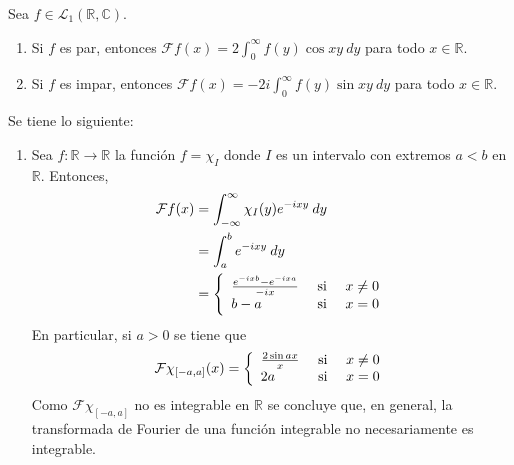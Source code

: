 \documentclass[12pt]{report}
\theoremstyle{largebreak}
\newcommand\cf[3]{\ensuremath{#1:#2\rightarrow#3}}
\newcommand{\fou}[1]{\ensuremath{\mathcal{F}#1}}
\begin{document}
    \begin{cor}
        Sea $f\in\mathcal{L}_1(\mathbb{R},\mathbb{C})$.
        \begin{enumerate}
            \item Si $f$ es par, entonces $\fou{f}(x)=2\int_0^{\infty}f(y)\cos xy\:dy$ para todo $x\in\mathbb{R}$.
            \item Si $f$ es impar, entonces $\fou{f}(x)=-2i\int_0^{\infty}f(y)\sin xy\:dy$ para todo $x\in\mathbb{R}$.
        \end{enumerate}
    \end{cor}

    \begin{exa}
        Se tiene lo siguiente:
        \begin{enumerate}
            \item Sea $\cf{f}{\mathbb{R}}{\mathbb{R}}$ la función $f=\chi_I$ donde $I$ es un intervalo con extremos $a<b$ en $\mathbb{R}$. Entonces,
            \begin{equation*}
                \begin{split}
                    \fou{f}(x)&=\int_{-\infty}^\infty \chi_I(y)e^{ -ixy}\:dy\\
                    &=\int_{a}^b e^{ -ixy}\:dy\\
                    &=\left\{ 
                        \begin{array}{lcr}
                            \frac{e^{ -ixb}-e^{ -ixa}}{-ix} & \textup{ si } & x\neq0\\
                            b-a & \textup{si} & x=0\\
                        \end{array}
                    \right.\\
                \end{split}
            \end{equation*}
            En particular, si $a>0$ se tiene que
            \begin{equation*}
                \fou{\chi_{[-a,a]}}(x)=\left\{ 
                    \begin{array}{lcr}
                        \frac{2\sin ax}{x} & \textup{ si } & x\neq0\\
                        2a & \textup{si} & x=0\\
                    \end{array}
                \right.
            \end{equation*}
            Como $\fou{\chi_{[-a,a]}}$ no es integrable en $\mathbb{R}$ se concluye que, en general, la transformada de Fourier de una función integrable no necesariamente es integrable.

\end{enumerate}
\end{exa}
\end{document}
